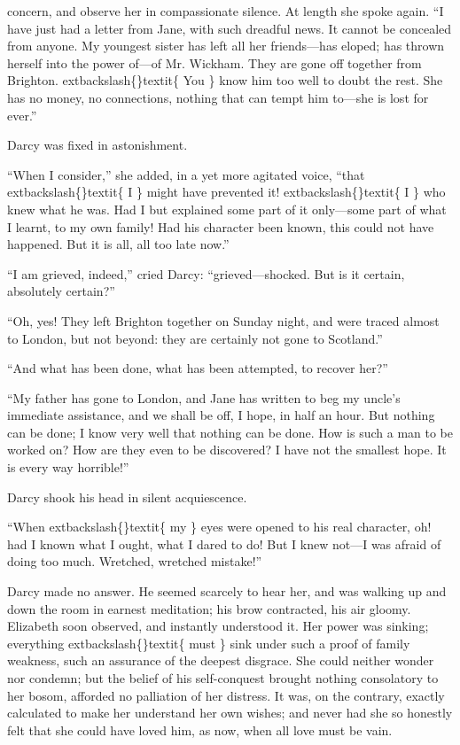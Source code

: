 \documentclass[10pt]{book}
\begin{document}
   concern, and observe her in compassionate silence. At length she spoke
again. “I have just had a letter from Jane, with such dreadful news. It
cannot be concealed from anyone. My youngest sister has left all her
friends—has eloped; has thrown herself into the power of—of Mr.
   Wickham. They are gone off together from Brighton.
   	extbackslash\{\}textit\{
    You
   \}
   know him too
well to doubt the rest. She has no money, no connections, nothing that
can tempt him to—she is lost for ever.”
  

   Darcy was fixed in astonishment.
  

   “When I consider,” she added, in a yet more agitated voice, “that
   	extbackslash\{\}textit\{
    I
   \}
   might have prevented it!
   	extbackslash\{\}textit\{
    I
   \}
   who knew what he was. Had I but explained
some part of it only—some part of what I learnt, to my own family! Had
his character been known, this could not have happened. But it is all,
all too late now.”
  

   “I am grieved, indeed,” cried Darcy: “grieved—shocked. But is it
certain, absolutely certain?”
  

   “Oh, yes! They left Brighton together on Sunday night, and were traced
almost to London, but not beyond: they are certainly not gone to
Scotland.”
  

   “And what has been done, what has been attempted, to recover her?”
  

   “My father has gone to London, and Jane has written to beg my uncle’s
immediate assistance, and we shall be off, I hope, in half an hour. But
nothing can be done; I know very well that nothing can be done. How is
such a man to be worked on? How are they even to be discovered? I have
not the smallest hope. It is every way horrible!”
  

   Darcy shook his head in silent acquiescence.
  

   “When
   	extbackslash\{\}textit\{
    my
   \}
   eyes were opened to his real character, oh! had I known what
I ought, what I dared to do! But I knew not—I was afraid of doing too
much. Wretched, wretched mistake!”
  

   Darcy made no answer. He seemed scarcely to hear her, and was walking up
and down the room in earnest meditation; his brow contracted, his air
gloomy.
   Elizabeth soon observed, and instantly understood it. Her power
was sinking; everything
   	extbackslash\{\}textit\{
    must
   \}
   sink under such a proof of family
weakness, such an assurance of the deepest disgrace. She could neither
wonder nor condemn; but the belief of his self-conquest brought nothing
consolatory to her bosom, afforded no palliation of her distress. It
was, on the contrary, exactly calculated to make her understand her own
wishes; and never had she so honestly felt that she could have loved
him, as now, when all love must be vain.
  
\end{document}
